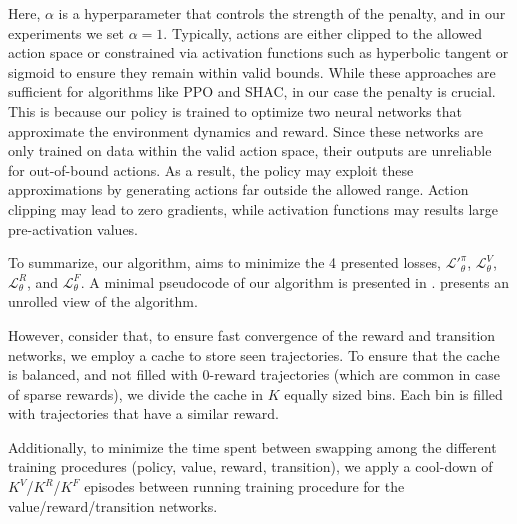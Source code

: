     Here, $\alpha$ is a hyperparameter that controls the strength of the penalty, and in our experiments we set $\alpha=1$. Typically, actions are either clipped to the allowed action space or constrained via activation functions such as hyperbolic tangent or sigmoid to ensure they remain within valid bounds. While these approaches are sufficient for algorithms like PPO and SHAC, in our case the penalty is crucial. This is because our policy is trained to optimize two neural networks that approximate the environment dynamics and reward. Since these networks are only trained on data within the valid action space, their outputs are unreliable for out-of-bound actions. As a result, the policy may exploit these approximations by generating actions far outside the allowed range. Action clipping may lead to zero gradients, while activation functions may results large pre-activation values. 



To summarize, our algorithm, aims to minimize the 4 presented losses, $\mathcal{L'}_\theta^{\pi}$, $\mathcal{L}_\theta^V$, $\mathcal{L}_\theta^R$, and $\mathcal{L}_\theta^F$. A minimal pseudocode of our algorithm is presented in .  presents an unrolled view of the \fname{} algorithm.

However, consider that, to ensure fast convergence of the reward and transition networks, we employ a cache to store seen trajectories. To ensure that the cache is balanced, and not filled with $0$-reward trajectories (which are common in case of sparse rewards), we divide the cache in $K$ equally sized bins. Each bin is filled with trajectories that have a similar reward. 

Additionally, to minimize the time spent between swapping among the different training procedures (policy, value, reward, transition), we apply a cool-down of $K^V$/$K^R$/$K^F$ episodes between running training procedure for the value/reward/transition networks. 

